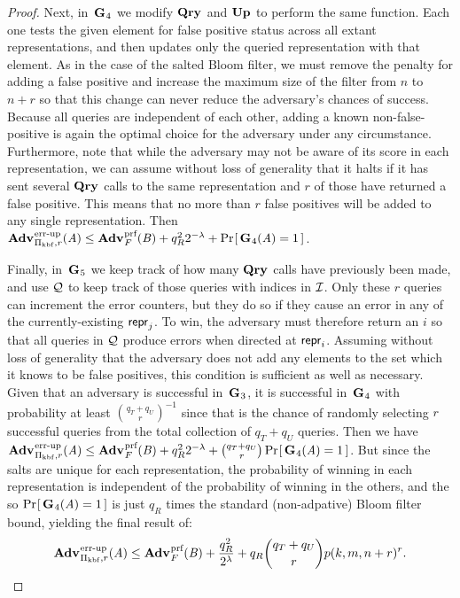 \begin{proof}
Next, in~$\mathbf{G}\hspace{0.5pt}_4$ we modify $\mathbf{Qry}\hspace{0.5pt}$ and $\mathbf{Up}\hspace{0.5pt}$ to perform the same function. Each one tests the given element for false positive status across all extant representations, and then updates only the queried representation with that element. As in the case of the salted Bloom filter, we must remove the penalty for adding a false positive and increase the maximum size of the filter from $n$ to $n+r$ so that this change can never reduce the adversary's chances of success.  Because all queries are independent of each other, adding a known non-false-positive is again the optimal choice for the adversary under any circumstance. Furthermore, note that while the adversary may not be aware of its score in each representation, we can assume without loss of generality that it halts if it has sent several $\mathbf{Qry}\hspace{0.5pt}$ calls to the same representation and $r$ of those have returned a false positive. This means that no more than $r$ false positives will be added to any single representation. Then $\Adv{\errep}_{\struct_\prfbloom,r}(\advA) \le \Adv{\prf}_F(\advB) + q_R^22^{-\lambda} + \Prob{\game_4(\advA)=1}$.

Finally, in~$\mathbf{G}\hspace{0.5pt}_5$ we keep track of how many $\mathbf{Qry}\hspace{0.5pt}$ calls have previously been made, and use $\mathcal{Q}$ to keep track of those queries with indices in $\mathcal{I}$. Only these $r$ queries can increment the error counters, but they do so if they cause an error in any of the currently-existing $\mathsf{repr}_j$. To win, the adversary must therefore return an $i$ so that all queries in $\mathcal{Q}$ produce errors when directed at $\mathsf{repr}_i$. Assuming without loss of generality that the adversary does not add any elements to the set which it knows to be false positives, this condition is sufficient as well as necessary. Given that an adversary is successful in~$\mathbf{G}\hspace{0.5pt}_3$, it is successful in~$\mathbf{G}\hspace{0.5pt}_4$ with probability at least $\binom{q_T+q_U}{r}^{-1}$ since that is the chance of randomly selecting $r$ successful queries from the total collection of $q_T+q_U$ queries. Then we have $\Adv{\errep}_{\struct_\prfbloom,r}(\advA) \le \Adv{\prf}_F(\advB) + q_R^22^{-\lambda} + \binom{q_T+q_U}{r}\Prob{\game_4(\advA)=1}$. But since the salts are unique for each representation, the probability of winning in each representation is independent of the probability of winning in the others, and the so $\Pr\hspace{-1pt}\left[\,\mathbf{G}\hspace{0.5pt}_4(\mathit{A})=1\,\right]$ is just $q_R$ times the standard (non-adpative) Bloom filter bound, yielding the final result of:
$$\Adv{\errep}_{\struct_\prfbloom,r}(\advA) \le \Adv{\prf}_F(\advB) + \frac{q_R^2}{2^\lambda} + q_R\binom{q_T+q_U}{r}p(k, m, n+r)^r.$$
\missingqed
\end{proof}


